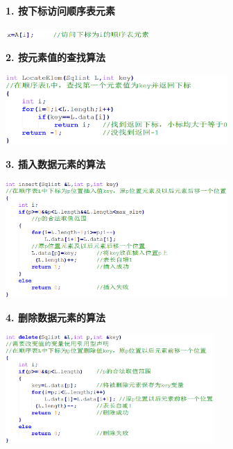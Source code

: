 \textbf{{1. 按下标访问顺序表元素}}

\includegraphics[width=2.18750in,height=0.10417in]{png-jpeg-pics/98374E4A1099338D04981D1ACB6B6417.png}

\textbf{{2. 按元素值的查找算法}}

\includegraphics[width=3.33333in,height=1.06250in]{png-jpeg-pics/2F1E51D3E4237550D9FDD9DA8D0C128A.png}

\textbf{{3. 插入数据元素的算法}}

\includegraphics[width=3.33333in,height=1.75000in]{png-jpeg-pics/CD4FB43A8A96D42B741B32A293CA4082.png}

\textbf{{4. 删除数据元素的算法}}

\includegraphics[width=3.12500in,height=1.64583in]{png-jpeg-pics/7633470FDBFBF6732CD62D088DFDF1A2.png}
